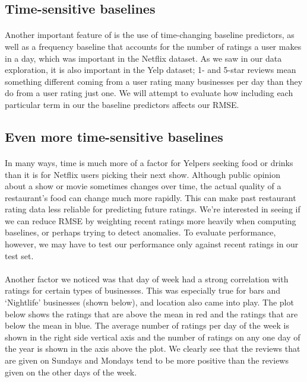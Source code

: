 \documentclass[11pt]{article}
\begin{document}
\subsection*{Time-sensitive baselines}

\paragraph{} Another important feature of \cite{koren} is the use of time-changing baseline predictors, as well as a frequency baseline that accounts for the number of ratings a user makes in a day, which was important in the Netflix dataset. As we saw in our data exploration, it is also important in the Yelp dataset; 1- and 5-star reviews mean something different coming from a user rating many businesses per day than they do from a user rating just one. We will attempt to evaluate how including each particular term in our the baseline predictors affects our RMSE.

\subsection*{Even more time-sensitive baselines}

\paragraph{} In many ways, time is much more of a factor for Yelpers seeking food or drinks than it is for Netflix users picking their next show. Although public opinion about a show or movie sometimes changes over time, the actual quality of a restaurant's food can change much more rapidly. This can make past restaurant rating data less reliable for predicting future ratings. We're interested in seeing if we can reduce RMSE by weighting recent ratings more heavily when computing baselines, or perhaps trying to detect anomalies. To evaluate performance, however, we may have to test our performance only against recent ratings in our test set.

\paragraph{} Another factor we noticed was that day of week had a strong correlation with ratings for certain types of businesses. This was especially true for bars and `Nightlife' businesses (shown below), and location also came into play. The plot below shows the ratings that are above the mean in red and the ratings that are below the mean in blue. The average number of ratings per day of the week is shown in the right side vertical axis and the number of ratings on any one day of the year is shown in the axis above the plot. We clearly see that the reviews that are given on Sundays and Mondays tend to be more positive than the reviews given on the other days of the week.
\end{document}
